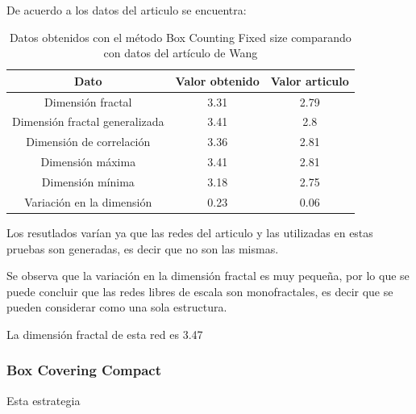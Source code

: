 De acuerdo a los datos del articulo se encuentra:

\begin{table}[H]
    \centering
    \begin{tabular}{|c|c|c|}
        \hline
         \textbf{Dato}& \textbf{Valor obtenido} & \textbf{Valor articulo} \\
         \hline
         Dimensión fractal & 3.31 & 2.79 \\
         \hline
         Dimensión fractal generalizada & 3.41 & 2.8 \\
         \hline
         Dimensión de correlación & 3.36& 2.81 \\
         \hline
         Dimensión máxima & 3.41 & 2.81 \\
         \hline
         Dimensión mínima & 3.18 & 2.75 \\
         \hline
         Variación en la dimensión & 0.23 & 0.06 \\
         \hline
    \end{tabular}
    \caption{Datos obtenidos con el método Box Counting Fixed size comparando con datos del artículo de Wang\cite{Wang2012}}
\end{table}

Los resutlados varían ya que las redes del articulo y las utilizadas en estas pruebas son generadas, es decir que no son las mismas.

Se observa que la variación en la dimensión fractal es muy pequeña, por lo que se puede concluir que las redes libres de escala son monofractales, es decir que se pueden considerar como una sola estructura.

La dimensión fractal de esta red es 3.47



\subsubsection{Box Covering Compact}

Esta estrategia